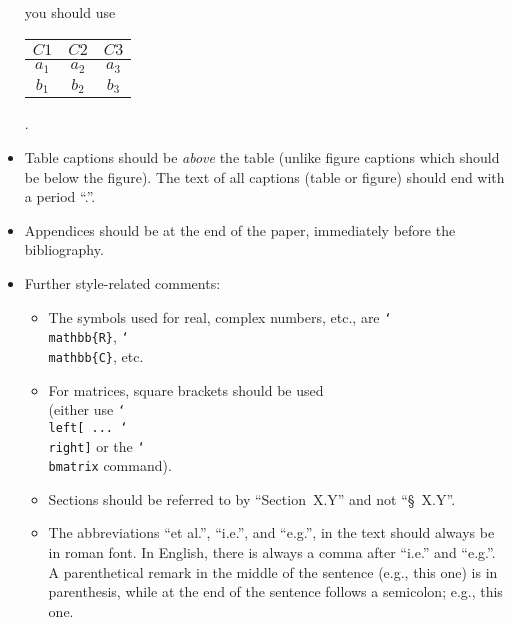 \documentclass{scrartcl}
\begin{document}
\begin{itemize}
you should use\\

\hspace{2cm}\begin{tabular}{c|c|c}
$C1$ & $C2$ & $C3$ \\ \hline
$a_1$ & $a_2$ & $a_3$ \\
$b_1$ & $b_2$ & $b_3$
\end{tabular}.\\

\item Table captions should be \emph{above} the table (unlike figure captions
  which should be below the figure). The text of all captions (table or figure)
  should end with a period ``.''.

\item Appendices should be at the end of the paper, immediately before the
bibliography.

\item Further style-related comments:
\begin{itemize}
\item The symbols used for real, complex numbers, etc.,
are \texttt{{\char`\\mathbb\{R\}}}, \texttt{{\char`\\mathbb\{C\}}}, etc.
%
\item For matrices, square brackets should be used \\
(either use
\texttt{\char`\\left[ ... \char`\\right]} or the \texttt{\char`\\bmatrix}
command).
%
\item Sections should be referred to by ``Section~X.Y'' and not ``\S~X.Y''.
%
\item The abbreviations ``et al.'', ``i.e.'', and ``e.g.'', in the text
should always be in roman font.
In English, there is always a comma after ``i.e.'' and ``e.g.''.
%
A parenthetical remark in the middle of the sentence (e.g., this one) is in
parenthesis, while at the end of the sentence follows a semicolon; e.g., this
one.
%
\end{itemize}
\end{itemize}
\end{document}
